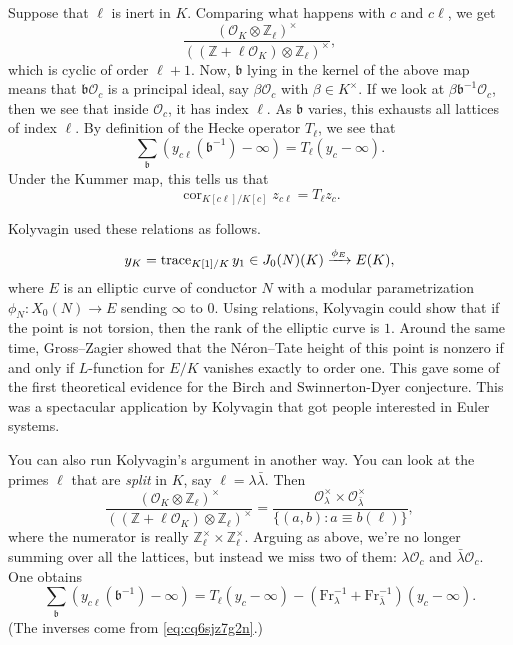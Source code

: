 \documentclass[reqno]{amsart} 
\numberwithin{theorem}{section}
\numberwithin{equation}{section}
\numberwithin{exercise}{section}
\begin{document}
Suppose that $\ell$ is inert in $K$.  Comparing what happens with $c$ and $c \ell$, we get
\begin{equation*}
  \frac{(\mathcal{O}_K \otimes \mathbb{Z}_{\ell})^\times}{((\mathbb{Z} + \ell \mathcal{O}_K) \otimes \mathbb{Z}_{\ell})^\times},
\end{equation*}
which is cyclic of order $\ell + 1$.  Now, $\mathfrak{b}$ lying in the kernel of the above map means that $\mathfrak{b} \mathcal{O}_c$ is a principal ideal, say $\beta \mathcal{O}_c$ with $\beta \in K^\times$.  If we look at $\beta \mathfrak{b}^{-1} \mathcal{O}_c$, then we see that inside $\mathcal{O}_c$, it has index $\ell$.  As $\mathfrak{b}$ varies, this exhausts all lattices of index $\ell$.  By definition of the Hecke operator $T_{\ell}$, we see that
\begin{equation*}
  \sum_{\mathfrak{b}} \left( y_{c \ell}(\mathfrak{b}^{-1}) - \infty \right) = T_{\ell}(y_c - \infty).
\end{equation*}
Under the Kummer map, this tells us that
\begin{equation*}
  \operatorname{cor}_{K[c \ell] / K[c]} z_{c \ell}
  = T_{\ell} z_c.  
\end{equation*}

Kolyvagin used these relations as follows.
\begin{equation*}
  y_K = \operatorname{trace}_{K[1] / K} y_1 \in J_0(N)(K) \xrightarrow{\phi_E} E(K),
\end{equation*}
where $E$ is an elliptic curve of conductor $N$ with a modular parametrization $\phi_N : X_0(N) \rightarrow E$ sending $\infty$ to $0$.  Using relations, Kolyvagin could show that if the point is not torsion, then the rank of the elliptic curve is $1$.  Around the same time, Gross--Zagier showed that the Néron--Tate height of this point is nonzero if and only if $L$-function for $E/K$ vanishes exactly to order one.  This gave some of the first theoretical evidence for the Birch and Swinnerton-Dyer conjecture.  This was a spectacular application by Kolyvagin that got people interested in Euler systems.

You can also run Kolyvagin's argument in another way.  You can look at the primes $\ell$ that are \emph{split} in $K$, say $\ell = \lambda \bar{\lambda}$.  Then
\begin{equation*}
  \frac{(\mathcal{O}_K \otimes \mathbb{Z}_{\ell})^\times}{((\mathbb{Z} + \ell \mathcal{O}_K) \otimes \mathbb{Z}_{\ell})^\times}
  =
  \frac{\mathcal{O}_\lambda^\times \times \mathcal{O}_{\bar{\lambda}}^\times}{\{(a, b) : a \equiv b(\ell)\}},
\end{equation*}
where the numerator is really $\mathbb{Z}_{\ell}^\times \times \mathbb{Z}_{\ell}^\times$.  Arguing as above, we're no longer summing over all the lattices, but instead we miss two of them: $\lambda \mathcal{O}_c$ and $\bar{\lambda} \mathcal{O}_c$.  One obtains
\begin{equation*}
  \sum_{\mathfrak{b}} (y_{c \ell}(\mathfrak{b}^{-1}) - \infty )
  =
  T_{\ell}(y_c - \infty)
  - (\mathrm{Fr}_\lambda^{-1} + \mathrm{Fr}_{\bar{\lambda}}^{-1})(y_c - \infty).
\end{equation*}
(The inverses come from \eqref{eq:cq6sjz7g2n}.)
\end{document}
